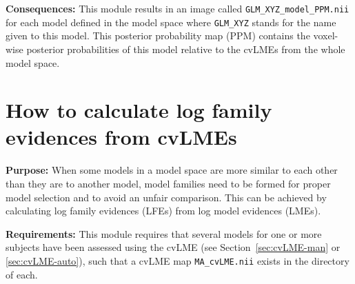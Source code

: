 \documentclass[a4paper,12pt]{article}
\begin{document}
\textbf{Consequences:} This module results in an image called \texttt{GLM\_XYZ\_model\_PPM.nii} for each model defined in the model space where \texttt{GLM\_XYZ} stands for the name given to this model. This posterior probability map (PPM) contains the voxel-wise posterior probabilities of this model relative to the cvLMEs from the whole model space.



\pagebreak
{}
\section{How to calculate log family evidences from cvLMEs} \label{sec:LFE}

\textbf{Purpose:} When some models in a model space are more similar to each other than they are to another model, model families need to be formed for proper model selection and to avoid an unfair comparison. This can be achieved by calculating log family evidences (LFEs) from log model evidences (LMEs).

\textbf{Requirements:} This module requires that several models for one or more subjects have been assessed using the cvLME (see Section~\ref{sec:cvLME-man} or \ref{sec:cvLME-auto}), such that a cvLME map \texttt{MA\_cvLME.nii} exists in the directory of each.
\end{document}
